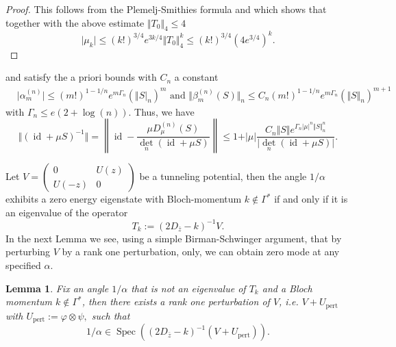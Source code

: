 \documentclass[reqno,12pt,letterpaper]{amsart}
\newtheorem{lemm}[theo]{Lemma}
\numberwithin{equation}{section}
\DeclareMathOperator{\Spec}{Spec}
\begin{document}
\begin{proof}
This follows from the Plemelj-Smithies formula \cite[Theo. 6.8]{Simon}
and 
\cite[Theorem 7.8]{Simon} which shows that together with the above estimate $\Vert T_0\Vert_4 \le 4$
\[ \vert \mu_k \vert \le (k!)^{3/4} e^{3k/4} \Vert T_0\Vert_4^k \le (k!)^{3/4} (4e^{3/4})^k.\]
\end{proof}
 \iffalse 
and satisfy the a priori bounds with $C_n$ a constant
\[\begin{split}
 &\vert \alpha_m^{(n)}\vert \le (m!)^{1-1/n} e^{m \Gamma_n}(\Vert S \vert_n)^m \text{ and } \Vert \beta_m^{(n)} (S)\Vert_n \le C_n (m!)^{1-1/n} e^{m \Gamma_n} (\Vert S \Vert_n)^{m+1}
 \end{split}\]
with $\Gamma_n \le e(2+\log(n)).$
Thus, we have 
\[ \Vert (\operatorname{id}+\mu S)^{-1}  \Vert = \left\lVert \operatorname{id}-\frac{\mu D_{\mu}^{(n)}(S)}{ \det_n(\operatorname{id}+\mu S) } \right\rVert \le 1 + \vert \mu \vert \frac{C_n \Vert S \Vert e^{\Gamma_n \vert \mu \vert^n \Vert S \Vert_n^n }}{\vert \det_n(\operatorname{id}+\mu S) \vert}.\]

Let $V = \begin{pmatrix} 0 & U(z) \\ U(-z) & 0 \end{pmatrix}$ be a tunneling potential, then the angle $1/\alpha$ exhibits a zero energy eigenstate with Bloch-momentum $k \notin \Gamma^*$ if and only if it is an eigenvalue of the operator
\[ T_k:=(2 D_{\bar z}-k)^{-1} V. \]
In the next Lemma we see, using a simple Birman-Schwinger argument, that by perturbing $V$ by a rank one perturbation, only, we can obtain zero mode at any specified $\alpha.$
\begin{lemm}
Fix an angle $1/\alpha$ that is not an eigenvalue of $T_k$ and a Bloch momentum $k \notin \Gamma^*$, then there exists a rank one perturbation of $V$, i.e. $V+U_{\text{pert}}$ with $U_{\text{pert}}:=\varphi \otimes \psi,$ such that $$1/\alpha \in \Spec( (2 D_{\bar z}-k)^{-1} (V+U_{\text{pert}})).$$
\end{lemm}
\end{document}

